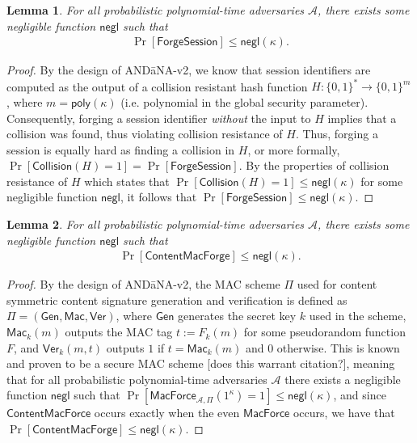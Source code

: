 \documentclass[10pt]{article}
\newtheorem{lemma}{\textbf{Lemma}}
\begin{document}
\begin{lemma}
For all probabilistic polynomial-time adversaries $\mathcal{A}$, there exists some negligible function $\mathsf{negl}$ such that
\begin{align*}
\Pr[\mathsf{ForgeSession}] \leq \mathsf{negl}(\kappa).
\end{align*}
\end{lemma}
\begin{proof}
By the design of {\sf AND\=aNA-v2}, we know that session identifiers are computed as the output of a collision resistant hash function $H : \{0,1\}^* \to \{0,1\}^{m}$, where $m = \mathsf{poly}(\kappa)$ (i.e. polynomial in the global security parameter). Consequently, forging a session identifier \emph{without} the input to $H$ implies that a collision was found, thus violating collision resistance of $H$. Thus, forging a session is equally hard as finding a collision in $H$, or more formally, $\Pr[\mathsf{Collision}(H) = 1] = \Pr[\mathsf{ForgeSession}]$. By the properties of collision resistance of $H$ which states that $\Pr[\mathsf{Collision}(H) = 1] \leq \mathsf{negl}(\kappa)$ for some negligible function $\mathsf{negl}$, it follows that $\Pr[\mathsf{ForgeSession}] \leq \mathsf{negl}(\kappa)$. 

\end{proof}

\begin{lemma}
For all probabilistic polynomial-time adversaries $\mathcal{A}$, there exists some negligible function $\mathsf{negl}$ such that
\begin{align*}
\Pr[\mathsf{ContentMacForge}] \leq \mathsf{negl}(\kappa).
\end{align*}
\end{lemma}
\begin{proof}
By the design of {\sf AND\=aNA-v2}, the MAC scheme $\Pi$ used for content symmetric content signature generation and verification is defined as $\Pi = (\mathsf{Gen}, \mathsf{Mac}, \mathsf{Ver})$, where $\mathsf{Gen}$ generates the secret key $k$ used in the scheme, $\mathsf{Mac}_k(m)$ outputs the MAC tag $t := F_k(m)$ for some pseudorandom function $F$, and $\mathsf{Ver}_k(m, t)$ outputs $1$ if $t = \mathsf{Mac}_k(m)$ and $0$ otherwise. This is known and proven to be a secure MAC scheme [does this warrant citation?], meaning that for all probabilistic polynomial-time adversaries $\mathcal{A}$ there exists a negligible function $\mathsf{negl}$ such that $\Pr[\mathsf{MacForce}_{\mathcal{A},\Pi}(1^{\kappa}) = 1] \leq \mathsf{negl}(\kappa)$, and since $\mathsf{ContentMacForce}$ occurs exactly when the even $\mathsf{MacForce}$ occurs, we have that $\Pr[\mathsf{ContentMacForge}] \leq \mathsf{negl}(\kappa)$.

\end{proof}
\end{document}

